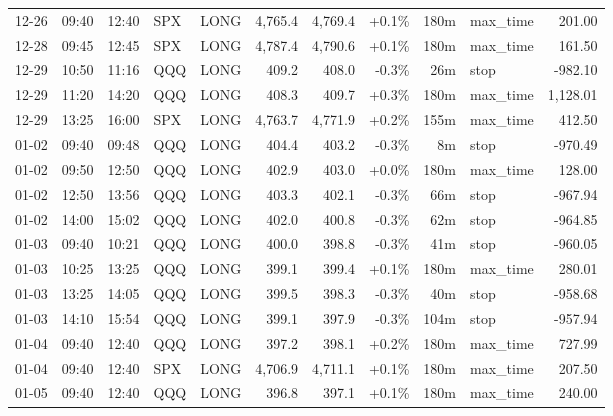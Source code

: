 \documentclass[11pt,a4paper,twoside]{article}
\begin{document}
\begin{center}
\begin{longtable}{>{\color{txtmain}}l l l l l r r r r >{\color{txtmain}}l r}
12-26 & 09:40 & 12:40 & SPX & LONG & 4,765.4 & 4,769.4 & \textcolor{wingreen}{+0.1\%} & 180m & max\_time & \textcolor{wingreen}{201.00} \\
12-28 & 09:45 & 12:45 & SPX & LONG & 4,787.4 & 4,790.6 & \textcolor{wingreen}{+0.1\%} & 180m & max\_time & \textcolor{wingreen}{161.50} \\
12-29 & 10:50 & 11:16 & QQQ & LONG & 409.2 & 408.0 & \textcolor{lossred}{-0.3\%} & 26m & stop & \textcolor{lossred}{-982.10} \\
12-29 & 11:20 & 14:20 & QQQ & LONG & 408.3 & 409.7 & \textcolor{wingreen}{+0.3\%} & 180m & max\_time & \textcolor{wingreen}{1,128.01} \\
12-29 & 13:25 & 16:00 & SPX & LONG & 4,763.7 & 4,771.9 & \textcolor{wingreen}{+0.2\%} & 155m & max\_time & \textcolor{wingreen}{412.50} \\
01-02 & 09:40 & 09:48 & QQQ & LONG & 404.4 & 403.2 & \textcolor{lossred}{-0.3\%} & 8m & stop & \textcolor{lossred}{-970.49} \\
01-02 & 09:50 & 12:50 & QQQ & LONG & 402.9 & 403.0 & \textcolor{wingreen}{+0.0\%} & 180m & max\_time & \textcolor{wingreen}{128.00} \\
01-02 & 12:50 & 13:56 & QQQ & LONG & 403.3 & 402.1 & \textcolor{lossred}{-0.3\%} & 66m & stop & \textcolor{lossred}{-967.94} \\
01-02 & 14:00 & 15:02 & QQQ & LONG & 402.0 & 400.8 & \textcolor{lossred}{-0.3\%} & 62m & stop & \textcolor{lossred}{-964.85} \\
01-03 & 09:40 & 10:21 & QQQ & LONG & 400.0 & 398.8 & \textcolor{lossred}{-0.3\%} & 41m & stop & \textcolor{lossred}{-960.05} \\
01-03 & 10:25 & 13:25 & QQQ & LONG & 399.1 & 399.4 & \textcolor{wingreen}{+0.1\%} & 180m & max\_time & \textcolor{wingreen}{280.01} \\
01-03 & 13:25 & 14:05 & QQQ & LONG & 399.5 & 398.3 & \textcolor{lossred}{-0.3\%} & 40m & stop & \textcolor{lossred}{-958.68} \\
01-03 & 14:10 & 15:54 & QQQ & LONG & 399.1 & 397.9 & \textcolor{lossred}{-0.3\%} & 104m & stop & \textcolor{lossred}{-957.94} \\
01-04 & 09:40 & 12:40 & QQQ & LONG & 397.2 & 398.1 & \textcolor{wingreen}{+0.2\%} & 180m & max\_time & \textcolor{wingreen}{727.99} \\
01-04 & 09:40 & 12:40 & SPX & LONG & 4,706.9 & 4,711.1 & \textcolor{wingreen}{+0.1\%} & 180m & max\_time & \textcolor{wingreen}{207.50} \\
01-05 & 09:40 & 12:40 & QQQ & LONG & 396.8 & 397.1 & \textcolor{wingreen}{+0.1\%} & 180m & max\_time & \textcolor{wingreen}{240.00} \\

\end{longtable}
\end{center}
\end{document}

